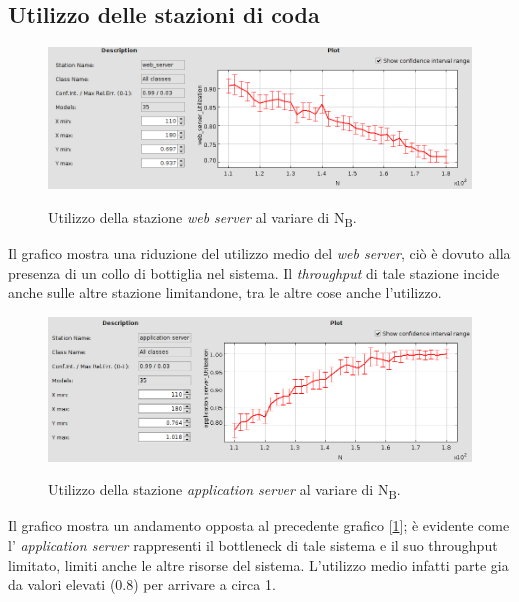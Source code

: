 \documentclass[../main.tex]{subfiles}
\begin{document}
    \subsection{Utilizzo delle stazioni di coda}\label{subsec:utilizzo-delle-stazioni-di-coda}
    \begin{figure}[H]
        \centering
        \includegraphics[scale = 0.5]{assets/utilization_ws.png}\\
        \caption[\textit{Utilizzo} della stazione \textit{web server}]{Utilizzo della stazione \textit{web server} al
        variare di N\textsubscript{B}.}
        \label{fig:utilizzo-ws}
    \end{figure}
    Il grafico mostra una riduzione del utilizzo medio del \textit{web server}, ciò è dovuto alla presenza di un collo
    di bottiglia nel sistema. Il \textit{throughput} di tale stazione incide anche sulle altre stazione limitandone, tra
    le altre cose anche l'utilizzo.

    \begin{figure}[H]
        \centering
        \includegraphics[scale = 0.5]{assets/utilization_as.png}\\
        \caption[\textit{Utilizzo} della stazione \textit{application server}]{Utilizzo della stazione\textit{
            application server} al variare di N\textsubscript{B}.}
        \label{fig:utilizzo-as}
    \end{figure}
    Il grafico mostra un andamento opposta al precedente grafico [\ref{fig:utilizzo-ws}]; è evidente come l'
    \textit{application server} rappresenti il bottleneck di tale sistema e il suo throughput limitato, limiti anche le
    altre risorse del sistema. L'utilizzo medio infatti parte gia da valori elevati (0.8) per arrivare a circa 1.
\end{document}
